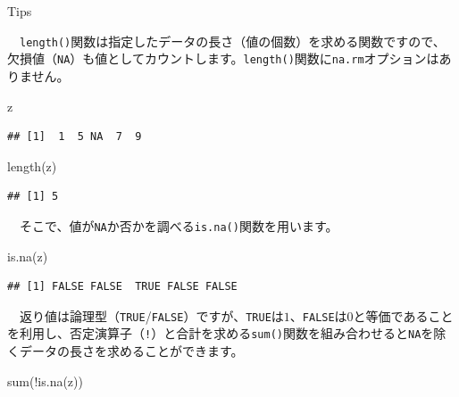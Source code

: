 \documentclass[
  12pt,
]{book}
\newenvironment{Shaded}{\begin{snugshade}}{\end{snugshade}}
\newcommand{\FunctionTok}[1]{\textcolor[rgb]{0.00,0.00,0.00}{#1}}
\newcommand{\NormalTok}[1]{#1}
\newcommand{\SpecialCharTok}[1]{\textcolor[rgb]{0.00,0.00,0.00}{#1}}
\begin{document}
\newpage

\begin{info-box}{Tips}

　\texttt{length()}関数は指定したデータの長さ（値の個数）を求める関数ですので、欠損値（\texttt{NA}）も値としてカウントします。\texttt{length()}関数に\texttt{na.rm}オプションはありません。

\begin{Shaded}
\begin{Highlighting}[numbers=left,,]
\NormalTok{z}
\end{Highlighting}
\end{Shaded}

\begin{verbatim}
## [1]  1  5 NA  7  9
\end{verbatim}

\begin{Shaded}
\begin{Highlighting}[numbers=left,,]
\FunctionTok{length}\NormalTok{(z)}
\end{Highlighting}
\end{Shaded}

\begin{verbatim}
## [1] 5
\end{verbatim}

　そこで、値が\texttt{NA}か否かを調べる\texttt{is.na()}関数を用います。

\begin{Shaded}
\begin{Highlighting}[numbers=left,,]
\FunctionTok{is.na}\NormalTok{(z)}
\end{Highlighting}
\end{Shaded}

\begin{verbatim}
## [1] FALSE FALSE  TRUE FALSE FALSE
\end{verbatim}

　返り値は論理型（\texttt{TRUE}/\texttt{FALSE}）ですが、\texttt{TRUE}は\(1\)、\texttt{FALSE}は\(0\)と等価であることを利用し、否定演算子（\texttt{!}）と合計を求める\texttt{sum()}関数を組み合わせると\texttt{NA}を除くデータの長さを求めることができます。

\begin{Shaded}
\begin{Highlighting}[numbers=left,,]
\FunctionTok{sum}\NormalTok{(}\SpecialCharTok{!}\FunctionTok{is.na}\NormalTok{(z))}
\end{Highlighting}
\end{Shaded}


\end{info-box}
\end{document}
